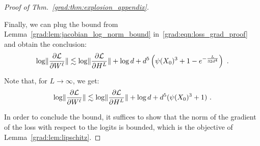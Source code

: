 \begin{proof}[Proof of Thm.~\ref{grad:thm:explosion_appendix}]
\begin{lemma}
\end{lemma}


Finally, we can plug the bound from Lemma~\ref{grad:lem:jacobian_log_norm_bound} in~\eqref{grad:eqn:loss_grad_proof} and obtain the conclusion:
\begin{align}
    \log \lVert\frac{\partial \mathcal{L}}{\partial W^\ell}\rVert \lesssim \log \lVert\frac{\partial \mathcal{L}}{\partial H^L}\rVert + \log d + d^5 \left(\psi(X_0)^3 + 1-e^{-\frac{L}{32d^4}}\right)~.
\end{align}

Note that, for $L \to \infty$, we get:
\begin{align}
    \log \lVert\frac{\partial \mathcal{L}}{\partial W^\ell}\rVert \lesssim \log \lVert\frac{\partial \mathcal{L}}{\partial H^L}\rVert + \log d + d^5 (\psi(X_0)^3 + 1)~.
\end{align}

In order to conclude the bound, it suffices to show that the norm of the gradient of the loss with respect to the logits is bounded, which is the objective of Lemma~\ref{grad:lem:lipschitz}. 
\end{proof}


